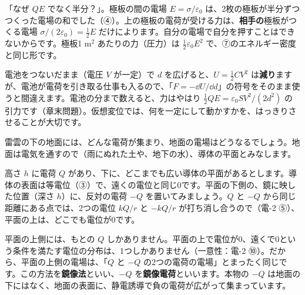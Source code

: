 \begin{phyomi}[$F=\tfrac12QE$]
「なぜ $QE$ でなく半分？」。極板の間の電場 $E=\sigma/\varepsilon_0$ は、2枚の極板が半分ずつつくった電場の和でした（④）。上の極板の電荷が受ける力は、\textbf{相手の}極板がつくる電場 $\sigma/(2\varepsilon_0)=\tfrac12E$ だけによります。自分の電場で自分を押すことはできないからです。極板1 m$^2$ あたりの力（圧力）は $\tfrac12\varepsilon_0E^2$ で、⑦のエネルギー密度と同じ形です。
\end{phyomi}

\begin{seikaku}
電池をつないだまま（電圧 $V$ が一定）で $d$ を広げると、$U=\tfrac12CV^2$ は\textbf{減り}ますが、電池が電荷を引き取る仕事も入るので、「$F=-\dd U/\dd d$」の符号をそのまま使うと間違えます。電池の分まで数えると、力はやはり $\tfrac12QE=\varepsilon_0SV^2/(2d^2)$ の引力です（章末問題）。仮想変位では、何を一定にして動かすかを、はっきりさせることが大切です。
\end{seikaku}

\label{ph:電-3:sec12}
雷雲の下の地面には、どんな電荷が集まり、地面の電場はどうなるでしょう。地面は電気を通すので（雨にぬれた土や、地下の水）、導体の平面とみなします。

高さ $h$ に電荷 $Q$ があり、下に、どこまでも広い導体の平面があるとします。導体の表面は等電位（③）で、遠くの電位と同じ0です。平面の下側の、鏡に映した位置（深さ $h$）に、反対の電荷 $-Q$ を置いてみましょう。$Q$ と $-Q$ から同じ距離にある点では、2つの電位 $kQ/r$ と $-kQ/r$ が打ち消し合うので（電-2 ⑤）、平面の上は、どこでも電位が0です。

平面の上側には、もとの $Q$ しかありません。平面の上で電位が0、遠くで0という条件を満たす電位の分布は、1つしかありません（一意性：電-2 ⑩）。だから、平面の上側の電場は、「$Q$ と $-Q$ の2つの電荷の電場」とまったく同じです。この方法を\textbf{鏡像法}といい、$-Q$ を\textbf{鏡像電荷}といいます。本物の $-Q$ は地面の下にはなく、地面の表面に、静電誘導で負の電荷が広がって集まっています。

